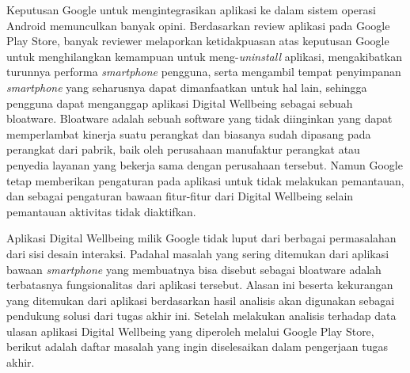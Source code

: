 Keputusan Google untuk mengintegrasikan aplikasi ke dalam sistem operasi Android memunculkan banyak opini. Berdasarkan review aplikasi pada Google Play Store, banyak reviewer melaporkan ketidakpuasan atas keputusan Google untuk menghilangkan kemampuan untuk meng-\textit{uninstall} aplikasi, mengakibatkan turunnya performa \textit{smartphone} pengguna, serta mengambil tempat penyimpanan \textit{smartphone} yang seharusnya dapat dimanfaatkan untuk hal lain, sehingga pengguna dapat menganggap aplikasi Digital Wellbeing sebagai sebuah bloatware. Bloatware adalah sebuah software yang tidak diinginkan yang dapat memperlambat kinerja suatu perangkat dan biasanya sudah dipasang pada perangkat dari pabrik, baik oleh perusahaan manufaktur perangkat atau penyedia layanan yang bekerja sama dengan perusahaan tersebut. \parencite{nordvpn2021bloatware} Namun Google tetap memberikan pengaturan pada aplikasi untuk tidak melakukan pemantauan, dan sebagai pengaturan bawaan fitur-fitur dari Digital Wellbeing selain pemantauan aktivitas tidak diaktifkan.

Aplikasi Digital Wellbeing milik Google tidak luput dari berbagai permasalahan dari sisi desain interaksi. Padahal masalah yang sering ditemukan dari aplikasi bawaan \textit{smartphone} yang membuatnya bisa disebut sebagai bloatware adalah terbatasnya fungsionalitas dari aplikasi tersebut. \parencite{forbes2018bloatware} Alasan ini beserta kekurangan yang ditemukan dari aplikasi berdasarkan hasil analisis akan digunakan sebagai pendukung solusi dari tugas akhir ini. Setelah melakukan analisis terhadap data ulasan aplikasi Digital Wellbeing yang diperoleh melalui Google Play Store, berikut adalah daftar masalah yang ingin diselesaikan dalam pengerjaan tugas akhir.




